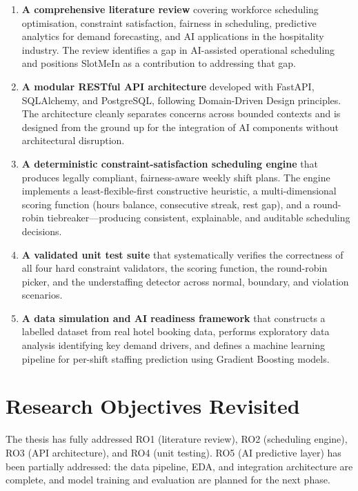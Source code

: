 \begin{enumerate}
    \item \textbf{A comprehensive literature review} covering workforce scheduling optimisation, constraint satisfaction, fairness in scheduling, predictive analytics for demand forecasting, and AI applications in the hospitality industry. The review identifies a gap in AI-assisted operational scheduling and positions SlotMeIn as a contribution to addressing that gap.

    \item \textbf{A modular RESTful API architecture} developed with FastAPI, SQLAlchemy, and PostgreSQL, following Domain-Driven Design principles. The architecture cleanly separates concerns across bounded contexts and is designed from the ground up for the integration of AI components without architectural disruption.

    \item \textbf{A deterministic constraint-satisfaction scheduling engine} that produces legally compliant, fairness-aware weekly shift plans. The engine implements a least-flexible-first constructive heuristic, a multi-dimensional scoring function (hours balance, consecutive streak, rest gap), and a round-robin tiebreaker—producing consistent, explainable, and auditable scheduling decisions.

    \item \textbf{A validated unit test suite} that systematically verifies the correctness of all four hard constraint validators, the scoring function, the round-robin picker, and the understaffing detector across normal, boundary, and violation scenarios.

    \item \textbf{A data simulation and AI readiness framework} that constructs a labelled dataset from real hotel booking data, performs exploratory data analysis identifying key demand drivers, and defines a machine learning pipeline for per-shift staffing prediction using Gradient Boosting models.
\end{enumerate}

\section{Research Objectives Revisited}

The thesis has fully addressed RO1 (literature review), RO2 (scheduling engine), RO3 (API architecture), and RO4 (unit testing). RO5 (AI predictive layer) has been partially addressed: the data pipeline, EDA, and integration architecture are complete, and model training and evaluation are planned for the next phase.

